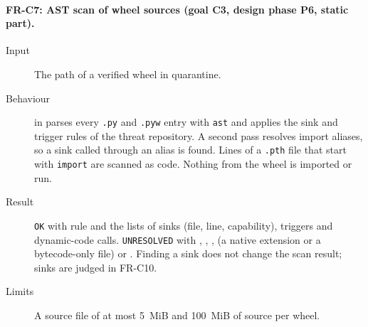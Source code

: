 \paragraph{FR-C7: AST scan of wheel sources (goal C3, design phase P6, static part).}
\begin{sloppypar}
\begin{description}
    \item[Input] The path of a verified wheel in quarantine.
    \item[Behaviour]  in  parses every \texttt{.py} and \texttt{.pyw} entry with \texttt{ast} and applies the sink and trigger rules of the threat repository. A second pass resolves import aliases, so a sink called through an alias is found. Lines of a \texttt{.pth} file that start with \texttt{import} are scanned as code. Nothing from the wheel is imported or run.
    \item[Result] \texttt{OK} with rule  and the lists of sinks (file, line, capability), triggers and dynamic-code calls. \texttt{UNRESOLVED} with , , ,  (a native extension or a bytecode-only file) or . Finding a sink does not change the scan result; sinks are judged in FR-C10.
    \item[Limits] A source file of at most 5~MiB and 100~MiB of source per wheel.
\end{description}
\end{sloppypar}

